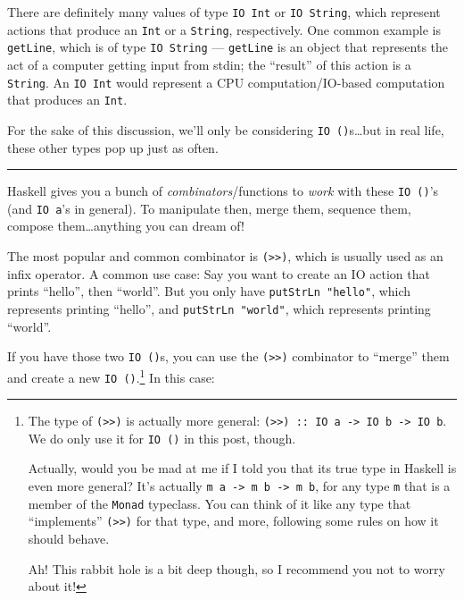 \documentclass[]{article}
\begin{document}
There are definitely many values of type \texttt{IO\ Int} or
\texttt{IO\ String}, which represent actions that produce an \texttt{Int} or a
\texttt{String}, respectively. One common example is \texttt{getLine}, which is
of type \texttt{IO\ String} --- \texttt{getLine} is an object that represents
the act of a computer getting input from stdin; the ``result'' of this action is
a \texttt{String}. An \texttt{IO\ Int} would represent a CPU
computation/IO-based computation that produces an \texttt{Int}.

For the sake of this discussion, we'll only be considering
\texttt{IO\ ()}s\ldots{}but in real life, these other types pop up just as
often.

\begin{center}\rule{0.5\linewidth}{\linethickness}\end{center}

Haskell gives you a bunch of \emph{combinators}/functions to \emph{work} with
these \texttt{IO\ ()}'s (and \texttt{IO\ a}'s in general). To manipulate then,
merge them, sequence them, compose them\ldots{}anything you can dream of!

The most popular and common combinator is
\texttt{(\textgreater{}\textgreater{})}, which is usually used as an infix
operator. A common use case: Say you want to create an IO action that prints
``hello'', then ``world''. But you only have \texttt{putStrLn\ "hello"}, which
represents printing ``hello'', and \texttt{putStrLn\ "world"}, which represents
printing ``world''.

If you have those two \texttt{IO\ ()}s, you can use the
\texttt{(\textgreater{}\textgreater{})} combinator to ``merge'' them and create
a new \texttt{IO\ ()}.\footnote{The type of
  \texttt{(\textgreater{}\textgreater{})} is actually more general:
  \texttt{(\textgreater{}\textgreater{})\ ::\ IO\ a\ -\textgreater{}\ IO\ b\ -\textgreater{}\ IO\ b}.
  We do only use it for \texttt{IO\ ()} in this post, though.

  Actually, would you be mad at me if I told you that its true type in Haskell
  is even more general? It's actually
  \texttt{m\ a\ -\textgreater{}\ m\ b\ -\textgreater{}\ m\ b}, for any type
  \texttt{m} that is a member of the \texttt{Monad} typeclass. You can think of
  it like any type that ``implements'' \texttt{(\textgreater{}\textgreater{})}
  for that type, and more, following some rules on how it should behave.

  Ah! This rabbit hole is a bit deep though, so I recommend you not to worry
  about it!} In this case:
\end{document}
